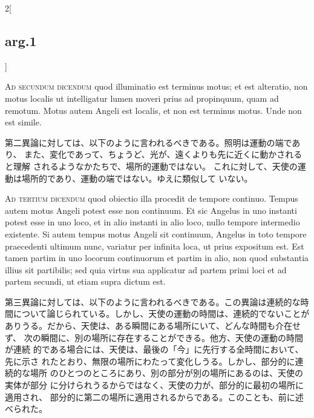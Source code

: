 \documentclass[paper=a4paper,fontsize=10pt,jafontsize=9pt,titlepage]{jlreq}
\begin{document}
\begin{paracol}{2}[\subsection{arg.1}]
\switchcolumn*[\subsection{ad.2}]

{\scshape Ad secundum dicendum} quod illuminatio est
terminus motus; et est alteratio, non motus localis ut intelligatur
lumen moveri prius ad propinquum, quam ad remotum. Motus autem Angeli
est localis, et non est terminus motus. Unde non est simile.

\switchcolumn

第二異論に対しては、以下のように言われるべきである。照明は運動の端であり、
また、変化であって、ちょうど、光が、遠くよりも先に近くに動かされると理解
されるようなかたちで、場所的運動ではない。
これに対して、天使の運動は場所的であり、運動の端ではない。ゆえに類似して
 いない。

\switchcolumn*[\subsection{ad.3}]

{\scshape Ad tertium dicendum} quod obiectio illa
procedit de tempore continuo. Tempus autem motus Angeli potest esse non
continuum. Et sic Angelus in uno instanti potest esse in uno loco, et in
alio instanti in alio loco, nullo tempore intermedio existente. Si autem
tempus motus Angeli sit continuum, Angelus in toto tempore praecedenti
ultimum nunc, variatur per infinita loca, ut prius expositum est. Est
tamen partim in uno locorum continuorum et partim in alio, non quod
substantia illius sit partibilis; sed quia virtus sua applicatur ad
partem primi loci et ad partem secundi, ut etiam supra dictum est.

\switchcolumn

第三異論に対しては、以下のように言われるべきである。この異論は連続的な時
間について論じられている。しかし、天使の運動の時間は、連続的でないことが
ありうる。だから、天使は、ある瞬間にある場所にいて、どんな時間も介在せず、
次の瞬間に、別の場所に存在することができる。他方、天使の運動の時間が連続
的である場合には、天使は、最後の「今」に先行する全時間において、先に示さ
れたとおり、無限の場所にわたって変化しうる。しかし、部分的に連続的な場所
 のひとつのところにあり、別の部分が別の場所にあるのは、天使の実体が部分
 に分けられうるからではなく、天使の力が、部分的に最初の場所に適用され、
 部分的に第二の場所に適用されるからである。このことも、前に述べられた。

\end{paracol}
\end{document}
